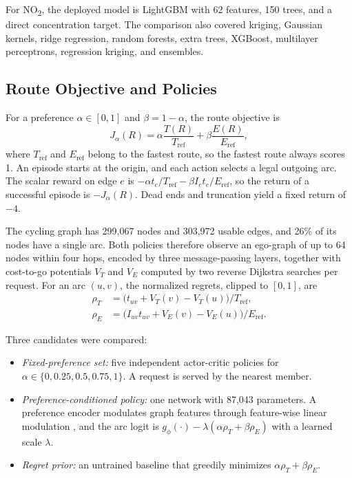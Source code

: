 \documentclass[conference]{IEEEtran}
\newcommand{\notwo}{NO\textsubscript{2}}
\begin{document}
For \notwo{}, the deployed model is LightGBM \cite{ke2017} with 62 features, 150 trees, and a direct concentration target. The comparison also covered kriging, Gaussian kernels, ridge regression, random forests, extra trees, XGBoost, multilayer perceptrons, regression kriging, and ensembles.

\subsection{Route Objective and Policies}

For a preference $\alpha\in[0,1]$ and $\beta=1-\alpha$, the route objective is
\begin{equation}
J_\alpha(R)=\alpha\frac{T(R)}{T_{\mathrm{ref}}}+\beta\frac{E(R)}{E_{\mathrm{ref}}},
\label{eq:objective}
\end{equation}
where $T_{\mathrm{ref}}$ and $E_{\mathrm{ref}}$ belong to the fastest route, so the fastest route always scores 1. An episode starts at the origin, and each action selects a legal outgoing arc. The scalar reward on edge $e$ is $-\alpha t_e/T_{\mathrm{ref}}-\beta I_e t_e/E_{\mathrm{ref}}$, so the return of a successful episode is $-J_\alpha(R)$. Dead ends and truncation yield a fixed return of $-4$.

The cycling graph has 299,067 nodes and 303,972 usable edges, and 26\% of its nodes have a single arc. Both policies therefore observe an ego-graph of up to 64 nodes within four hops, encoded by three message-passing layers, together with cost-to-go potentials $V_T$ and $V_E$ computed by two reverse Dijkstra searches per request. For an arc $(u,v)$, the normalized regrets, clipped to $[0,1]$, are
\begin{equation}
\begin{aligned}
\rho_T&=\bigl(t_{uv}+V_T(v)-V_T(u)\bigr)/T_{\mathrm{ref}},\\
\rho_E&=\bigl(I_{uv}t_{uv}+V_E(v)-V_E(u)\bigr)/E_{\mathrm{ref}}.
\end{aligned}
\label{eq:regret}
\end{equation}

Three candidates were compared:
\begin{itemize}
\item \textit{Fixed-preference set:} five independent actor-critic policies for $\alpha\in\{0,0.25,0.5,0.75,1\}$. A request is served by the nearest member.
\item \textit{Preference-conditioned policy:} one network with 87,043 parameters. A preference encoder modulates graph features through feature-wise linear modulation \cite{perez2018}, and the arc logit is $g_\phi(\cdot)-\lambda(\alpha\rho_T+\beta\rho_E)$ with a learned scale $\lambda$.
\item \textit{Regret prior:} an untrained baseline that greedily minimizes $\alpha\rho_T+\beta\rho_E$.
\end{itemize}
\end{document}
